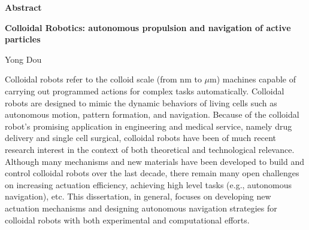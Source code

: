 

\begin{titlepage}
\begin{center}

\vspace*{1\baselineskip}
\textbf{\large Abstract}

\textbf{Colloidal Robotics: autonomous propulsion and navigation of active particles}

Yong Dou
\end{center}

\hspace{5mm}Colloidal robots refer to the colloid scale (from nm to $\mu$m) machines capable of carrying out programmed actions for complex tasks automatically.   Colloidal robots are designed to mimic the dynamic behaviors of living cells such as autonomous motion, pattern formation, and navigation. Because of the colloidal robot's promising application in engineering and medical service, namely drug delivery and single cell surgical, colloidal robots have been of much recent research interest in the context of both theoretical and technological relevance. Although many mechanisms and new materials have been developed to build and control colloidal robots over the last decade, there remain many open challenges on increasing actuation efficiency, achieving high level tasks (e.g., autonomous navigation), etc. This dissertation, in general, focuses on developing new actuation mechanisms and designing  autonomous navigation strategies for colloidal robots with both experimental and computational efforts.


\end{titlepage}
